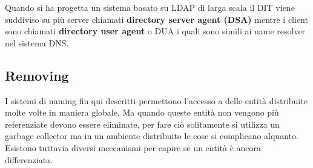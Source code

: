 Quando si ha progetta un sistema basato su LDAP di larga scala il DIT viene suddiviso su più server chiamati \textbf{directory server agent (DSA)} mentre i client sono chiamati \textbf{directory user agent} o DUA i quali sono simili ai name resolver nel sistema DNS.
\subsection{Removing}
I sistemi di naming fin qui descritti permettono l'accesso a delle entità distribuite molte volte in maniera globale. Ma quando queste entità non vengono più referenziate devono essere eliminate, per fare ciò solitamente si utilizza un garbage collector ma in un ambiente distribuito le cose si complicano alquanto.\\
Esistono tuttavia diversi meccanismi per capire se un entità è ancora differenziata.
